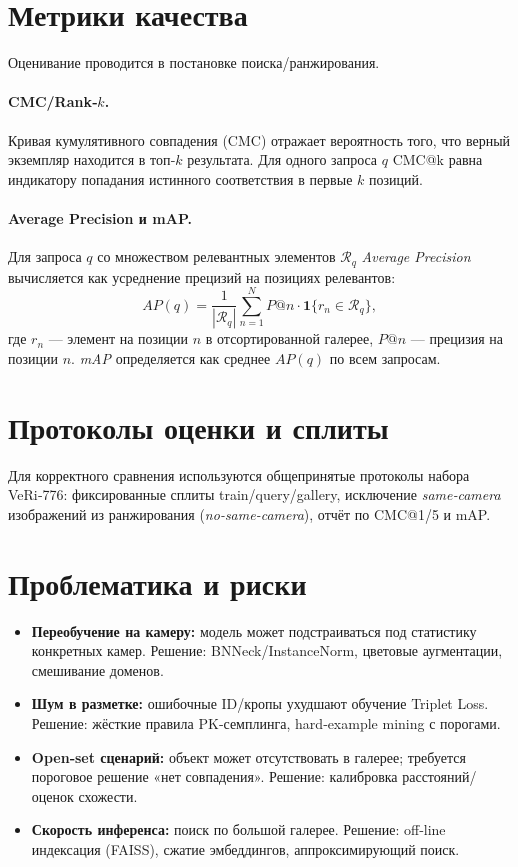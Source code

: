 \section{Метрики качества}
Оценивание проводится в постановке поиска/ранжирования.
\paragraph{CMC/Rank‑$k$.} Кривая кумулятивного совпадения (CMC) отражает вероятность того, что верный экземпляр находится в топ‑$k$ результата. Для одного запроса \(q\) CMC@k равна индикатору попадания истинного соответствия в первые \(k\) позиций.
\paragraph{Average Precision и mAP.} Для запроса \(q\) со множеством релевантных элементов \(\mathcal{R}_q\) \emph{Average Precision} вычисляется как усреднение прецизий на позициях релевантов:
\begin{equation}
AP(q) = \frac{1}{|\mathcal{R}_q|}\sum_{n=1}^{N} P@n \cdot \mathbf{1}\{r_n \in \mathcal{R}_q\},
\end{equation}
где \(r_n\) — элемент на позиции \(n\) в отсортированной галерее, \(P@n\) — прецизия на позиции \(n\). \emph{mAP} определяется как среднее \(AP(q)\) по всем запросам.

\section{Протоколы оценки и сплиты}
Для корректного сравнения используются общепринятые протоколы набора VeRi‑776: фиксированные сплиты train/query/gallery, исключение \emph{same‑camera} изображений из ранжирования (\emph{no-same-camera}), отчёт по CMC@1/5 и mAP. %

\section{Проблематика и риски}
\begin{itemize}
  \item \textbf{Переобучение на камеру:} модель может подстраиваться под статистику конкретных камер. Решение: BNNeck/InstanceNorm, цветовые аугментации, смешивание доменов.
  \item \textbf{Шум в разметке:} ошибочные ID/кропы ухудшают обучение Triplet Loss. Решение: жёсткие правила PK‑семплинга, hard‑example mining с порогами.
  \item \textbf{Open‑set сценарий:} объект может отсутствовать в галерее; требуется пороговое решение «нет совпадения». Решение: калибровка расстояний/оценок схожести.
  \item \textbf{Скорость инференса:} поиск по большой галерее. Решение: off‑line индексация (FAISS), сжатие эмбеддингов, аппроксимирующий поиск.
\end{itemize}
